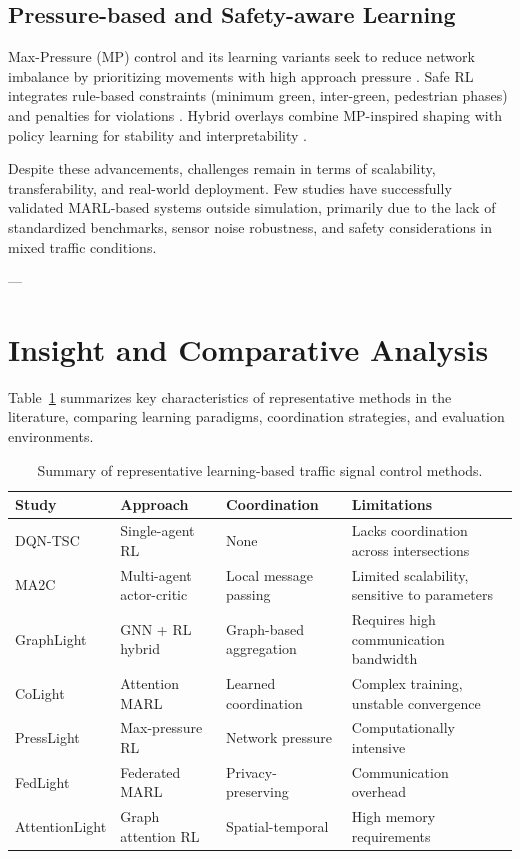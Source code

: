 \documentclass[12pt]{report} %
\begin{document}
\subsection*{Pressure-based and Safety-aware Learning}
Max-Pressure (MP) control and its learning variants seek to reduce network imbalance by prioritizing movements with high approach pressure \cite{MaxPressure_2013,PressLight_2019}. Safe RL integrates rule-based constraints (minimum green, inter-green, pedestrian phases) and penalties for violations \cite{Du_2023}. Hybrid overlays combine MP-inspired shaping with policy learning for stability and interpretability \cite{CoordinatedDQL_2022}.

Despite these advancements, challenges remain in terms of scalability, transferability, and real-world deployment. Few studies have successfully validated MARL-based systems outside simulation, primarily due to the lack of standardized benchmarks, sensor noise robustness, and safety considerations in mixed traffic conditions.

---

\section{Insight and Comparative Analysis}

Table~\ref{tab:related_work_comparison} summarizes key characteristics of representative methods in the literature, comparing learning paradigms, coordination strategies, and evaluation environments.

\begin{table}[H]
\centering
\caption{Summary of representative learning-based traffic signal control methods.}
\label{tab:related_work_comparison}
\begin{tabular}{p{3cm} p{3cm} p{3cm} p{4cm}}
\toprule
\textbf{Study} & \textbf{Approach} & \textbf{Coordination} & \textbf{Limitations} \\
\midrule
DQN-TSC \cite{Genders2019} & Single-agent RL & None & Lacks coordination across intersections \\
MA2C \cite{Chu2019MA2C} & Multi-agent actor-critic & Local message passing & Limited scalability, sensitive to parameters \\
GraphLight \cite{GraphLight2023} & GNN + RL hybrid & Graph-based aggregation & Requires high communication bandwidth \\
CoLight \cite{Colight_2019} & Attention MARL & Learned coordination & Complex training, unstable convergence \\
PressLight \cite{PressLight_2019} & Max-pressure RL & Network pressure & Computationally intensive \\
FedLight \cite{FedLight_2021} & Federated MARL & Privacy-preserving & Communication overhead \\
AttentionLight \cite{AttentionLight_2023} & Graph attention RL & Spatial-temporal & High memory requirements \\
\bottomrule
\end{tabular}
\end{table}
\end{document}
